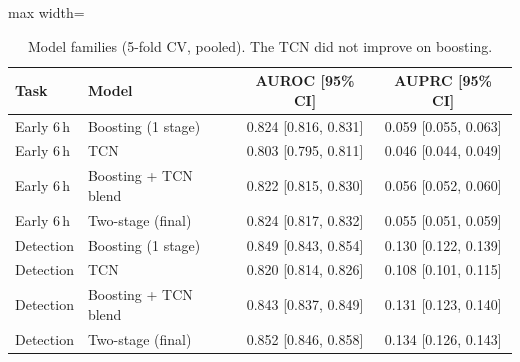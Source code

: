 \begin{table}[!t]
\centering\footnotesize
\caption{Model families (5-fold CV, pooled). The TCN did not improve on boosting.}
\label{tab:family}
\begin{adjustbox}{max width=\linewidth}
\begin{tabular}{llcc}
\toprule
Task & Model & AUROC [95\% CI] & AUPRC [95\% CI] \\
\midrule
Early 6\,h & Boosting (1 stage) & 0.824 [0.816, 0.831] & 0.059 [0.055, 0.063] \\
Early 6\,h & TCN & 0.803 [0.795, 0.811] & 0.046 [0.044, 0.049] \\
Early 6\,h & Boosting + TCN blend & 0.822 [0.815, 0.830] & 0.056 [0.052, 0.060] \\
Early 6\,h & Two-stage (final) & 0.824 [0.817, 0.832] & 0.055 [0.051, 0.059] \\
\midrule
Detection & Boosting (1 stage) & 0.849 [0.843, 0.854] & 0.130 [0.122, 0.139] \\
Detection & TCN & 0.820 [0.814, 0.826] & 0.108 [0.101, 0.115] \\
Detection & Boosting + TCN blend & 0.843 [0.837, 0.849] & 0.131 [0.123, 0.140] \\
Detection & Two-stage (final) & 0.852 [0.846, 0.858] & 0.134 [0.126, 0.143] \\
\bottomrule
\end{tabular}
\end{adjustbox}
\end{table}
